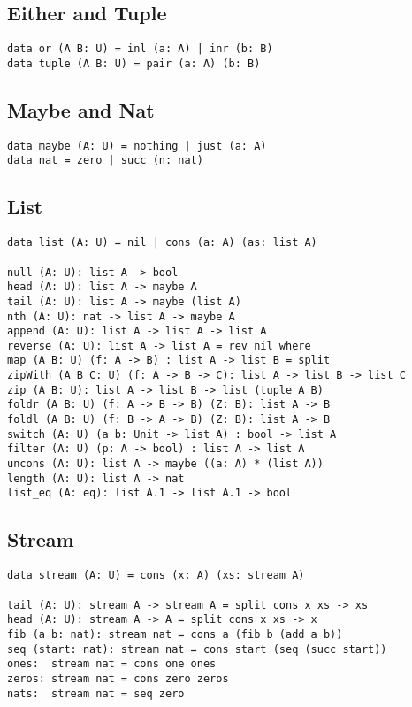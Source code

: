 \documentclass{article}
\begin{document}
\subsection{Either and Tuple}

\begin{lstlisting}[mathescape=true]
data or (A B: U) = inl (a: A) | inr (b: B)
data tuple (A B: U) = pair (a: A) (b: B)
\end{lstlisting}

\subsection{Maybe and Nat}

\begin{lstlisting}[mathescape=true]
data maybe (A: U) = nothing | just (a: A)
data nat = zero | succ (n: nat)
\end{lstlisting}

\subsection{List}

\begin{lstlisting}[mathescape=true]
data list (A: U) = nil | cons (a: A) (as: list A)

null (A: U): list A -> bool
head (A: U): list A -> maybe A
tail (A: U): list A -> maybe (list A)
nth (A: U): nat -> list A -> maybe A
append (A: U): list A -> list A -> list A
reverse (A: U): list A -> list A = rev nil where
map (A B: U) (f: A -> B) : list A -> list B = split
zipWith (A B C: U) (f: A -> B -> C): list A -> list B -> list C
zip (A B: U): list A -> list B -> list (tuple A B)
foldr (A B: U) (f: A -> B -> B) (Z: B): list A -> B
foldl (A B: U) (f: B -> A -> B) (Z: B): list A -> B
switch (A: U) (a b: Unit -> list A) : bool -> list A
filter (A: U) (p: A -> bool) : list A -> list A
uncons (A: U): list A -> maybe ((a: A) * (list A))
length (A: U): list A -> nat
list_eq (A: eq): list A.1 -> list A.1 -> bool
\end{lstlisting}

\subsection{Stream}

\begin{lstlisting}[mathescape=true]
data stream (A: U) = cons (x: A) (xs: stream A)

tail (A: U): stream A -> stream A = split cons x xs -> xs
head (A: U): stream A -> A = split cons x xs -> x
fib (a b: nat): stream nat = cons a (fib b (add a b))
seq (start: nat): stream nat = cons start (seq (succ start))
ones:  stream nat = cons one ones
zeros: stream nat = cons zero zeros
nats:  stream nat = seq zero
\end{lstlisting}
\end{document}

